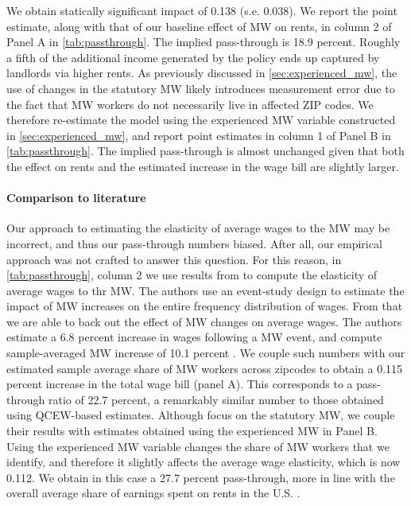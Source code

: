 We obtain statically significant impact of 0.138 (s.e. 0.038). We report the point estimate, 
along with that of our baseline effect of MW on rents, in column 2 of Panel A in 
\autoref{tab:passthrough}. The implied pass-through is 18.9 percent. Roughly a fifth of the 
additional income generated by the policy ends up captured by landlords via higher rents. As 
previously discussed in \autoref{sec:experienced_mw}, the use of changes in the statutory 
MW likely introduces measurement error due to the fact that MW workers do not necessarily 
live in affected ZIP codes. We therefore re-estimate the model using the experienced MW 
variable constructed in \autoref{sec:experienced_mw}, and report point estimates in column 
1 of Panel B in \autoref{tab:passthrough}. The implied pass-through is almost unchanged given 
that both the effect on rents and the estimated increase in the wage bill are slightly larger.

\paragraph{Comparison to literature} Our approach to estimating the elasticity of average wages
to the MW may be incorrect, and thus our pass-through numbers biased. After all, our empirical
approach was not crafted to answer this question. For this reason, in \autoref{tab:passthrough}, 
column 2 we use results from \textcite{CegnizEtAl2019} to compute the elasticity of average wages 
to thr MW. The authors use an event-study design to estimate the impact of MW increases on the 
entire frequency distribution of wages. From that we are able to back out the effect of MW 
changes on average wages. The authors estimate a 6.8 percent increase in wages following a MW
event, and compute sample-averaged MW increase of 10.1 percent \parencite[][Table I]
{CegnizEtAl2019}. We couple such numbers with our estimated sample average share of MW workers 
across zipcodes to obtain a 0.115 percent increase in the total wage bill (panel A). This 
corresponds to a pass-through ratio of 22.7 percent, a remarkably similar number to those 
obtained using QCEW-based estimates. Although \textcite{CegnizEtAl2019} focus on the statutory MW, 
we couple their results with estimates obtained using the experienced MW in Panel B. Using the 
experienced MW variable changes the share of MW workers that we identify, and therefore it 
slightly affects the average wage elasticity, which is now 0.112. We obtain in this case a 
27.7 percent pass-through, more in line with the overall average share of earnings spent on 
rents in the U.S. \parencite{fernald2020americas}.   

